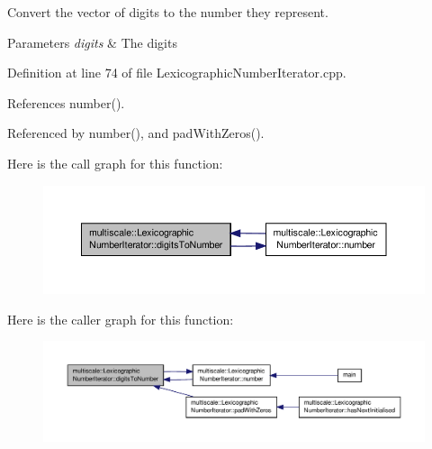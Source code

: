Convert the vector of digits to the number they represent. 


\begin{DoxyParams}{Parameters}
{\em digits} & The digits \\
\hline
\end{DoxyParams}


Definition at line 74 of file Lexicographic\-Number\-Iterator.\-cpp.



References number().



Referenced by number(), and pad\-With\-Zeros().



Here is the call graph for this function\-:\nopagebreak
\begin{figure}[H]
\begin{center}
\leavevmode
\includegraphics[width=350pt]{classmultiscale_1_1LexicographicNumberIterator_a9bcb610b3b63b02ceed7d556960e57c3_cgraph}
\end{center}
\end{figure}




Here is the caller graph for this function\-:
\nopagebreak
\begin{figure}[H]
\begin{center}
\leavevmode
\includegraphics[width=350pt]{classmultiscale_1_1LexicographicNumberIterator_a9bcb610b3b63b02ceed7d556960e57c3_icgraph}
\end{center}
\end{figure}


